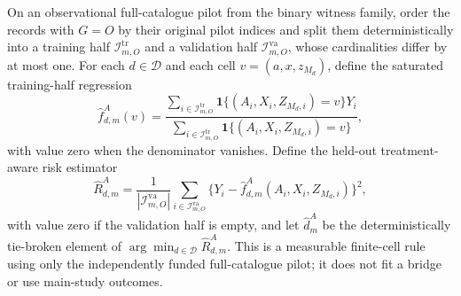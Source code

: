 On an observational full-catalogue pilot from the binary witness family, order the records with \(G=O\) by their original pilot indices and split them deterministically into a training half \(\mathcal I_{m,O}^{\mathrm{tr}}\) and a validation half \(\mathcal I_{m,O}^{\mathrm{va}}\), whose cardinalities differ by at most one. For each \(d\in\mathcal D\) and each cell \(v=(a,x,z_{M_d})\), define the saturated training-half regression
\[
 \widehat f_{d,m}^A(v)=
 \frac{\sum_{i\in\mathcal I_{m,O}^{\mathrm{tr}}}
 \mathbf 1\{(A_i,X_i,Z_{M_d,i})=v\}Y_i}
 {\sum_{i\in\mathcal I_{m,O}^{\mathrm{tr}}}
 \mathbf 1\{(A_i,X_i,Z_{M_d,i})=v\}},
\]
with value zero when the denominator vanishes. Define the held-out treatment-aware risk estimator
\[
 \widehat R_{d,m}^A=
 \frac{1}{|\mathcal I_{m,O}^{\mathrm{va}}|}
 \sum_{i\in\mathcal I_{m,O}^{\mathrm{va}}}
 \{Y_i-\widehat f_{d,m}^A(A_i,X_i,Z_{M_d,i})\}^2,
\]
with value zero if the validation half is empty, and let \(\widehat d_m^A\) be the deterministically tie-broken element of \(\arg\min_{d\in\mathcal D}\widehat R_{d,m}^A\). This is a measurable finite-cell rule using only the independently funded full-catalogue pilot; it does not fit a bridge or use main-study outcomes.